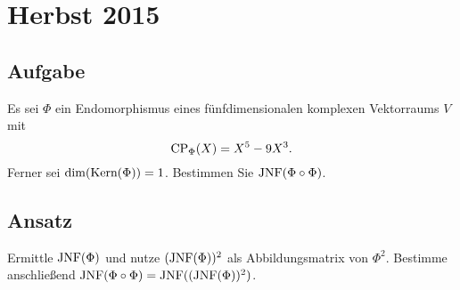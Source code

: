 \section{Herbst 2015}

\subsection{Aufgabe}
Es sei \( \Phi \) ein Endomorphismus eines fünfdimensionalen komplexen Vektorraums \( V \) mit 
\begin{equation*}
	\text{CP}_\Phi(X)=X^5-9X^3\text{.}
\end{equation*}
Ferner sei \( \dim(\text{Kern}(\Phi))=1 \). Bestimmen Sie \( \text{JNF}(\Phi \circ \Phi) \).

\subsection{Ansatz}
Ermittle \( \text{JNF}(\Phi) \) und nutze \( (\text{JNF}(\Phi))^2 \) als Abbildungsmatrix von \( \Phi^2 \). Bestimme anschließend \( \text{JNF}(\Phi \circ \Phi) = \text{JNF}((\text{JNF}(\Phi))^2) \).

